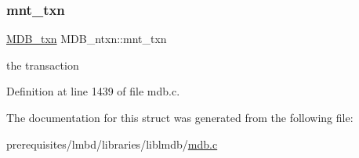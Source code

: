 \mbox{\label{struct_m_d_b__ntxn_ac27cfb66da175236abbde2ed9ac75b9c}} 
\subsubsection{\texorpdfstring{mnt\+\_\+txn}{mnt\_txn}}
{\footnotesize\ttfamily \mbox{\hyperlink{struct_m_d_b__txn}{M\+D\+B\+\_\+txn}} M\+D\+B\+\_\+ntxn\+::mnt\+\_\+txn}

the transaction 

Definition at line 1439 of file mdb.\+c.



The documentation for this struct was generated from the following file\+:\begin{DoxyCompactItemize}
\item 
prerequisites/lmbd/libraries/liblmdb/\mbox{\hyperlink{mdb_8c}{mdb.\+c}}\end{DoxyCompactItemize}
